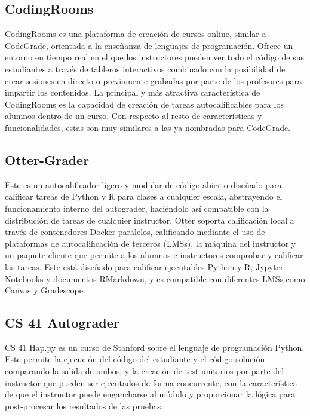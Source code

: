 \subsection{CodingRooms}

CodingRooms\cite{tool:CodingRooms} es una plataforma de creación de cursos online, similar a CodeGrade, orientada a la enseñanza de lenguajes de programación. Ofrece un entorno en tiempo real en el que los instructores pueden ver todo el código de sus estudiantes a través de tableros interactivos combinado con la posibilidad de crear sesiones en directo o previamente grabadas por parte de los profesores para impartir los contenidos.
La principal y más atractiva característica de CodingRooms es la capacidad de creación de tareas autocalificables para los alumnos dentro de un curso. Con respecto al resto de características y funcionalidades, estas son muy similares a las ya nombradas para CodeGrade.


\subsection{Otter-Grader}
Este es un autocalificador \cite{tool:Otter-Grader} ligero y modular de código abierto diseñado para calificar tareas de Python y R para clases a cualquier escala, abstrayendo el funcionamiento interno del autograder, haciéndolo así compatible con la distribución de tareas de cualquier instructor.
Otter soporta calificación local a través de contenedores Docker paralelos, calificando mediante el uso de plataformas de autocalificación de terceros (LMSs), la máquina del instructor y un paquete cliente que permite a los alumnos e instructores comprobar y calificar las tareas. Este está diseñado para calificar ejecutables Python y R, Jypyter Notebooks y documentos RMarkdown, y es compatible con diferentes LMSs como Canvas y Gradescope.


\subsection{CS 41 Autograder}

CS 41 Hap.py\cite{tool:CS41Autograder} es un curso de Stanford sobre el lenguaje de programación Python. Este permite la ejecución del código del estudiante y el código solución comparando la salida de ambos, y la creación de test unitarios por parte del instructor que pueden ser ejecutados de forma concurrente, con la característica de que el instructor puede engancharse al módulo y proporcionar la lógica para post-procesar los resultados de las pruebas.
